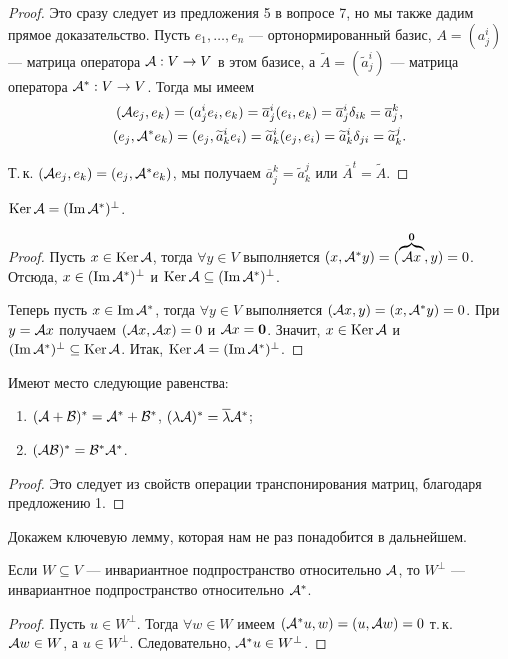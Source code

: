 \begin{proof}
    Это сразу следует из предложения 5 в вопросе 7, но мы также дадим прямое доказательство. Пусть $e_1, \ldots, e_n$ --- ортонормированный базис, $A = (a^i_j)$ --- матрица оператора $\mathcal{A}: V \to V$ в этом базисе, а $\widetilde{A} = (\widetilde{a}^i_j)$ --- матрица оператора $\mathcal{A}^\ast: V \to V$. Тогда мы имеем
    \begin{gather*}
        (\mathcal{A} e_j, e_k) = (a^i_je_i, e_k) = \overline{a}^i_j(e_i, e_k) = \overline{a}^i_j\delta_{ik} = \overline{a}^k_j,\\
        (e_j, \mathcal{A}^\ast e_k) = (e_j, \widetilde{a}^i_ke_i) = \widetilde{a}^i_k(e_j, e_i) = \widetilde{a}^i_k\delta_{ji} = \widetilde{a}^j_k.
    \end{gather*}

    Т.\,к. $(\mathcal{A} e_j, e_k) = (e_j, \mathcal{A}^\ast e_k)$, мы получаем $\overline{a}^k_j = \widetilde{a}^j_k$ или $\overline{A}^t = \widetilde{A}$.
\end{proof}

\begin{proposal}
    $\operatorname{Ker}\mathcal{A} = (\operatorname{Im}\mathcal{A}^\ast)^\perp$.
\end{proposal}

\begin{proof}
    Пусть $x \in \operatorname{Ker}\mathcal{A}$, тогда $\forall y \in V$ выполняется $(x, \mathcal{A}^\ast y) = (\overbrace{\mathcal{A} x}^{\boldsymbol{0}}, y) = 0$. Отсюда, $x \in (\operatorname{Im}\mathcal{A}^\ast)^\perp$ и $\operatorname{Ker}\mathcal{A} \subseteq (\operatorname{Im}\mathcal{A}^\ast)^\perp$.

    Теперь пусть $x \in \operatorname{Im}\mathcal{A}^\ast$, тогда $\forall y \in V$ выполняется $(\mathcal{A} x, y) = (x, \mathcal{A}^\ast y) = 0$. При $y = \mathcal{A} x$ получаем $(\mathcal{A} x, \mathcal{A} x) = 0$ и $\mathcal{A} x = \boldsymbol{0}$. Значит, $x \in \operatorname{Ker}\mathcal{A}$ и $(\operatorname{Im}\mathcal{A}^\ast)^\perp \subseteq \operatorname{Ker}\mathcal{A}$. Итак, $\operatorname{Ker}\mathcal{A} = (\operatorname{Im}\mathcal{A}^\ast)^\perp$.
\end{proof}

\begin{proposal}
    Имеют место следующие равенства:
    \begin{enumerate}[nolistsep]
        \item $(\mathcal{A} + \mathcal{B})^\ast = \mathcal{A}^\ast + \mathcal{B}^\ast$, $(\lambda\mathcal{A})^\ast = \overline{\lambda}\mathcal{A}^\ast$;
        \item $(\mathcal{A}\mathcal{B})^\ast = \mathcal{B}^\ast\mathcal{A}^\ast$.
    \end{enumerate}
\end{proposal}

\begin{proof}
    Это следует из свойств операции транспонирования матриц, благодаря предложению 1.
\end{proof}

Докажем ключевую лемму, которая нам не раз понадобится в дальнейшем.

\begin{lemma}
    Если $W \subseteq V$ --- инвариантное подпространство относительно $\mathcal{A}$, то $W^\perp$ --- инвариантное подпространство относительно $\mathcal{A}^\ast$.
\end{lemma}

\begin{proof}
    Пусть $u \in W^\perp$. Тогда $\forall w \in W$ имеем $(\mathcal{A}^\ast u, w) = (u, \mathcal{A} w) = 0$ т.\,к. $\mathcal{A} w \in W$, а $u \in W^\perp$. Следовательно, $\mathcal{A}^\ast u \in W^\perp$.
\end{proof}

